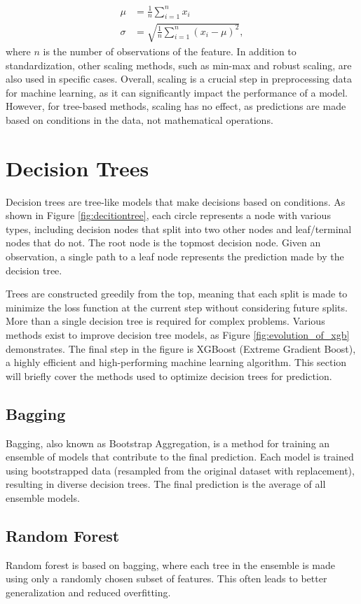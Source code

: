 \begin{align}
\mu &= \frac{1}{n}\sum_{i=1}^{n}x_i\\
\sigma &= \sqrt{\frac{1}{n}\sum_{i=1}^{n}(x_i - \mu)^2},
\end{align}
where $n$ is the number of observations of the feature.
In addition to standardization, other scaling methods, such as min-max and robust scaling, are also used in specific cases.
Overall, scaling is a crucial step in preprocessing data for machine learning, as it can significantly impact the performance of a model.
However, for tree-based methods, scaling has no effect, as predictions are made based on conditions in the data, not mathematical operations.


\section{Decision Trees}
Decision trees are tree-like models that make decisions based on conditions.
As shown in Figure \ref{fig:decitiontree}, each circle represents a node with various types, including decision nodes that split into two other nodes and leaf/terminal nodes that do not.
The root node is the topmost decision node.
Given an observation, a single path to a leaf node represents the prediction made by the decision tree.

Trees are constructed greedily from the top, meaning that each split is made to minimize the loss function at the current step without considering future splits.
More than a single decision tree is required for complex problems.
Various methods exist to improve decision tree models, as Figure \ref{fig:evolution_of_xgb} demonstrates.
The final step in the figure is XGBoost (Extreme Gradient Boost), a highly efficient and high-performing machine learning algorithm.
This section will briefly cover the methods used to optimize decision trees for prediction.

\subsection{Bagging}
Bagging, also known as Bootstrap Aggregation, is a method for training an ensemble of models that contribute to the final prediction.
Each model is trained using bootstrapped data (resampled from the original dataset with replacement), resulting in diverse decision trees.
The final prediction is the average of all ensemble models.

\subsection{Random Forest}
Random forest is based on bagging, where each tree in the ensemble is made using only a randomly chosen subset of features.
This often leads to better generalization and reduced overfitting.

